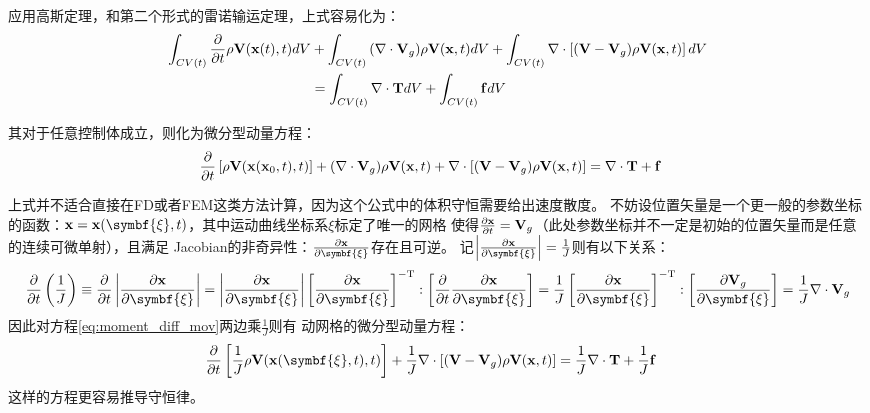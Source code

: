 \documentclass[UTF8,zihao=5]{ctexart} %
\newcommand{\bm}[1]{{\mathbf{#1}}}
\newcommand*{\pd}[2]{\frac{\partial #1}{\partial #2}}
\begin{document}
应用高斯定理，和第二个形式的雷诺输运定理，上式容易化为：
\begin{equation}
    \begin{aligned}
        \int_{CV(t)}{
            \pd{}{t}\rho\V(\xx(t),t) dV
        }
        & +
        \int_{CV(t)}{
            (\nabla\cdot\V_g)\rho\V(\xx,t) dV
        }
        +
        \int_{CV(t)}{
            \nabla\cdot\left[(\V-\V_g)\rho\V(\xx,t)\right]   dV
        }\\
        & =
        \int_{CV(t)}{\nabla\cdot\bm{T} dV} +
        \int_{CV(t)}{\bm{f} dV}
    \end{aligned}
\end{equation}

其对于任意控制体成立，则化为微分型动量方程：
\begin{equation}
    \begin{aligned}
        \pd{}{t}\left[\rho\V(\xx(\xx_0,t),t)\right]
        & +
        (\nabla\cdot\V_g)\rho\V(\xx,t)
        +
        \nabla\cdot\left[(\V-\V_g)\rho\V(\xx,t)\right]
        =
        \nabla\cdot\bm{T}
        +
        \bm{f}
    \end{aligned}
    \label{eq:moment_diff_mov}
\end{equation}

\newcommand*{\xxii}[0]{\symbf{\xi}}

上式并不适合直接在FD或者FEM这类方法计算，因为这个公式中的体积守恒需要给出速度散度。
不妨设位置矢量是一个更一般的参数坐标的函数：$\xx=\xx(\xxii,t)$，其中运动曲线坐标系$\xi$标定了唯一的网格
使得$\pd{\xx}{t}=\V_g$（此处参数坐标并不一定是初始的位置矢量而是任意的连续可微单射），且满足
Jacobian的非奇异性：$\pd{\xx}{\xxii}$存在且可逆。
记$\left|\pd{\xx}{\xxii}\right|=\frac{1}{J}$则有以下关系：
\begin{equation}
    \pd{}{t}\left(\frac{1}{J}\right) \equiv \pd{}{t}\left|\pd{\xx}{\xxii}\right|
     =  \left|\pd{\xx}{\xxii}\right|\left[\pd{\xx}{\xxii}\right]^{-\mathrm{T}}:
     \left[\pd{}{t}\pd{\xx}{\xxii}\right]
     =\frac{1}{J}\left[\pd{\xx}{\xxii}\right]^{-\mathrm{T}}:
     \left[\pd{\V_g}{\xxii}\right]
     =\frac{1}{J}\nabla\cdot\V_g
\end{equation}
因此对方程\eqref{eq:moment_diff_mov}两边乘$\frac{1}{J}$则有
动网格的微分型动量方程：
\begin{equation}
    \begin{aligned}
        \pd{}{t}\left[\frac{1}{J}\rho\V(\xx(\xxii,t),t)\right]
        &
        +
        \frac{1}{J}\nabla\cdot\left[(\V-\V_g)\rho\V(\xx,t)\right]
        =
        \frac{1}{J}\nabla\cdot\bm{T}
        +
        \frac{1}{J}\bm{f}
    \end{aligned}
\end{equation}
这样的方程更容易推导守恒律。
\end{document}
